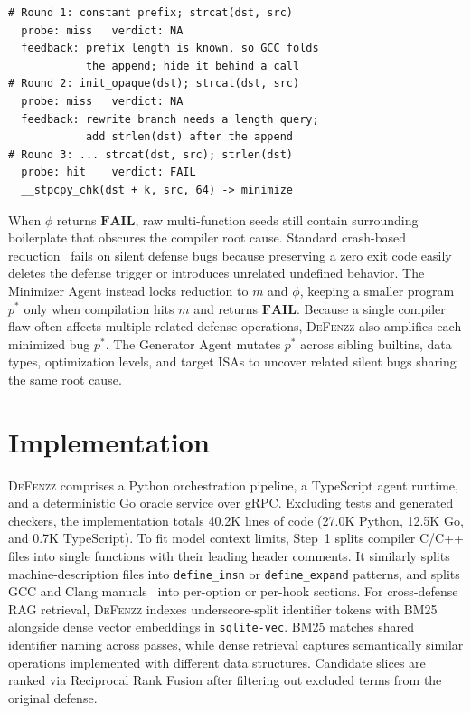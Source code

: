 \documentclass[conference,compsoc]{IEEEtran}
\begin{document}
\par\vspace{5pt}\noindent\begin{minipage}{\columnwidth}
\begin{lstlisting}[language={}, keepspaces=true, morekeywords={probe,verdict,feedback}, morecomment={[l]{\#}}, numbers=none, xleftmargin=3pt, framexleftmargin=0pt, caption={An example run of \autoref{alg:fuzz-loop} on \texttt{INV-FORT-014}.}, label={lst:loop-example}]
# Round 1: constant prefix; strcat(dst, src)
  probe: miss   verdict: NA
  feedback: prefix length is known, so GCC folds
            the append; hide it behind a call
# Round 2: init_opaque(dst); strcat(dst, src)
  probe: miss   verdict: NA
  feedback: rewrite branch needs a length query;
            add strlen(dst) after the append
# Round 3: ... strcat(dst, src); strlen(dst)
  probe: hit    verdict: FAIL
  __stpcpy_chk(dst + k, src, 64) -> minimize
\end{lstlisting}
\end{minipage}\par\vspace{5pt}

When $\phi$ returns $\mathbf{FAIL}$, raw multi-function seeds still contain surrounding boilerplate that obscures the compiler root cause. Standard crash-based reduction~\cite{creduce,sun2018perses} fails on silent defense bugs because preserving a zero exit code easily deletes the defense trigger or introduces unrelated undefined behavior. The Minimizer Agent instead locks reduction to $m$ and $\phi$, keeping a smaller program $p^*$ only when compilation hits $m$ and returns $\mathbf{FAIL}$. Because a single compiler flaw often affects multiple related defense operations, \textsc{DeFenzz} also amplifies each minimized bug $p^*$. The Generator Agent mutates $p^*$ across sibling builtins, data types, optimization levels, and target ISAs to uncover related silent bugs sharing the same root cause.

\section{Implementation}\label{sec:impl}

\textsc{DeFenzz} comprises a Python orchestration pipeline, a TypeScript agent runtime, and a deterministic Go oracle service over gRPC. Excluding tests and generated checkers, the implementation totals 40.2K lines of code (27.0K Python, 12.5K Go, and 0.7K TypeScript). To fit model context limits, Step~1 splits compiler C/C++ files into single functions with their leading header comments. It similarly splits machine-description files into \texttt{define\_insn} or \texttt{define\_expand} patterns, and splits GCC and Clang manuals~\cite{gcc15instrumentation} into per-option or per-hook sections. For cross-defense RAG retrieval, \textsc{DeFenzz} indexes underscore-split identifier tokens with BM25 alongside dense vector embeddings in \texttt{sqlite-vec}. BM25 matches shared identifier naming across passes, while dense retrieval captures semantically similar operations implemented with different data structures. Candidate slices are ranked via Reciprocal Rank Fusion after filtering out excluded terms from the original defense.
\end{document}
